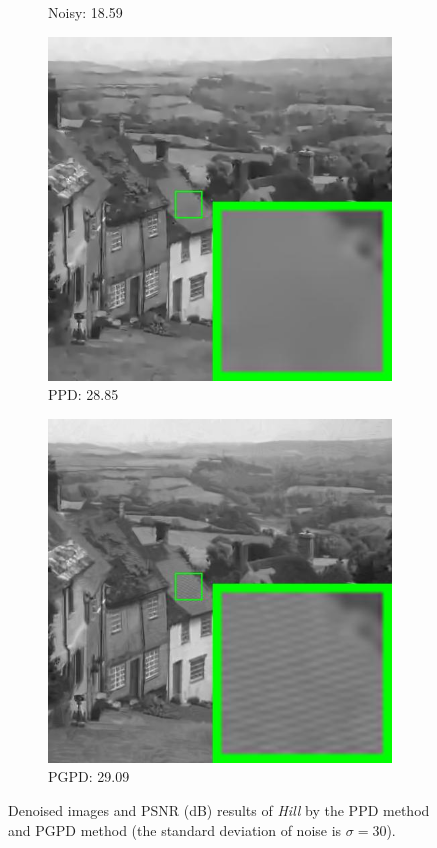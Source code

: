 \begin{figure}
\begin{subfigure}[t]{0.24\textwidth}
		\caption{Noisy: 18.59}
    \end{subfigure}
    \hfill
    \begin{subfigure}[t]{0.24\textwidth}
        \centering
        \includegraphics[width=1\textwidth]{images/pgpd/pgdpd/br_GMM65_30_hill.jpg}
		\caption{PPD: 28.85}
    \end{subfigure}
    \hfill
    \begin{subfigure}[t]{0.24\textwidth}
        \centering
        \includegraphics[width=1\textwidth]{images/pgpd/pgdpd/br_our_30_hill.jpg}
		\caption{PGPD: 29.09}
    \end{subfigure}
    \caption{Denoised images and PSNR (dB) results of \textsl{Hill} by the PPD method and PGPD method (the standard deviation of noise is $\sigma=30$).}
    \label{fig2-6}
\end{figure}


